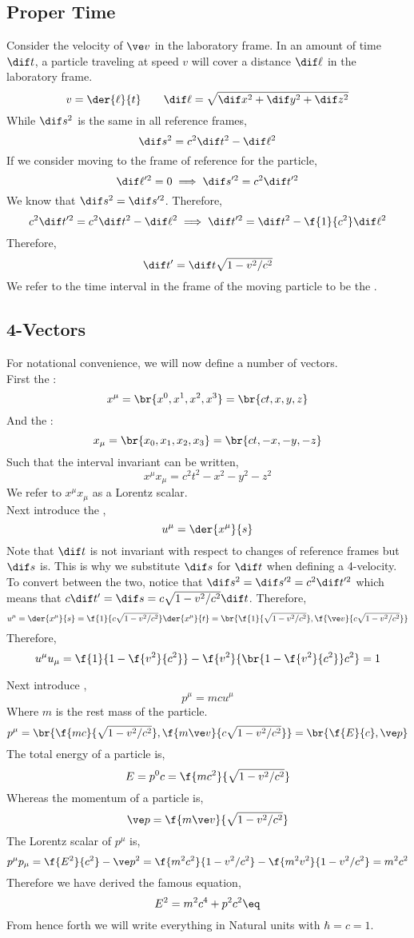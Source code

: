 \documentclass{article}
\begin{document}
\subsection{Proper Time}
Consider the velocity of $\ve v$ in the laboratory frame. In an amount of time $\dif t$, a particle traveling at speed $v$ will cover a distance $\dif \ell$ in the laboratory frame.
\[ v =\der{\ell}{t} \qquad \dif \ell = \sqrt{\dif x^2 + \dif y^2 + \dif z^2} \]
While $\dif s^2$ is the same in all reference frames,
\[ \dif s^2 = c^2 \dif t^2 - \dif \ell^2 \]
If we consider moving to the frame of reference for the particle,
\[ \dif \ell'^2 = 0 \implies \dif s'^2 = c^2 \dif t'^2 \]
We know that $\dif s^2 = \dif s'^2$. Therefore,
\[ c^2 \dif t'^2 = c^2 \dif t^2 - \dif \ell^2 \implies \dif t'^2 = \dif t^2 - \f{1}{c^2} \dif \ell^2\]
Therefore,
\[ \dif t' = \dif t \sqrt{1 - v^2/c^2} \]
We refer to the time interval in the frame of the moving particle to be the .

\subsection{4-Vectors}
For notational convenience, we will now define a number of vectors.\\

First the :
\[ x^{\mu} = \br{x^{0}, x^{1}, x^{2}, x^{3}} = \br{ct, x, y, z} \]
And the :
\[ x_{\mu} = \br{x_{0}, x_{1}, x_{2}, x_{3}} = \br{ct, -x, -y, -z} \]
Such that the interval invariant can be written,
\[ x^{\mu} x_{\mu} = c^2 t^2 - x^2 - y^2 - z^2 \]
We refer to $x^{\mu} x_{\mu}$ as a Lorentz scalar. \\

Next introduce the ,
\[ u^{\mu} = \der{x^{\mu}}{s} \]
Note that $\dif t$ is not invariant with respect to changes of reference frames but $\dif s$ is. This is why we substitute $\dif s$ for $\dif t$ when defining a 4-velocity. To convert between the two, notice that $\dif s^2 = \dif s'^2 = c^2 \dif t'^2$ which means that $c \dif t' = \dif s = c \sqrt{1 - v^2/c^2} \dif t$. Therefore,
\[ u^{\mu}= \der{x^{\mu}}{s} = \f{1}{c\sqrt{1 - v^2/c^2}} \der{x^{\mu}}{t} = \br{\f{1}{\sqrt{1 - v^2/c^2}}, \f{\ve v}{c\sqrt{1 - v^2/c^2}}}   \]
Therefore,
\[ u^{\mu}u_{\mu} = \f{1}{1 - \f{v^2}{c^2}} - \f{v^2}{\br{1 - \f{v^2}{c^2}} c^2} = 1\]

Next introduce ,
\[ p^{\mu} = m c u^{\mu} \]
Where $m$ is the rest mass of the particle.
\[ p^{\mu} = \br{\f{mc}{\sqrt{1 - v^2 / c^2}}, \f{m\ve v}{c\sqrt{1 - v^2 / c^2}}} = \br{\f{E}{c}, \ve p} \]
The total energy of a particle is,
\[ E = p^{0} c = \f{mc^2}{\sqrt{1 - v^2 / c^2}} \]
Whereas the momentum of a particle is,
\[  \ve p = \f{m \ve v}{\sqrt{1 - v^2/c^2}} \]
The Lorentz scalar of $p^{\mu}$ is,
\[ p^{\mu} p_{\mu} = \f{E^2}{c^2} - \ve p^2 = \f{m^2 c^2}{1 - v^2 / c^2} - \f{m^2 v^2}{1 - v^2 / c^2} = m^2 c^2\]
Therefore we have derived the famous equation,
\[ E^2 = m^2 c^4 + p^2 c^2 \eq \label{eq:einstein_famous_eqn}\]
From hence forth we will write everything in Natural units with $\hbar = c = 1$.
\end{document}
